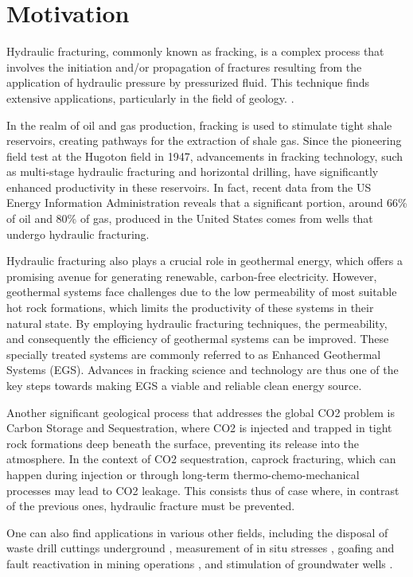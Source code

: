 \section{Motivation}

Hydraulic fracturing, commonly known as fracking, is a complex process that involves the initiation and/or propagation of fractures resulting from the application of hydraulic pressure by pressurized fluid. This technique finds extensive applications, particularly in the field of geology. \cite{adachi2007computer}.

In the realm of oil and gas production, fracking is used to stimulate tight shale reservoirs, creating pathways for the extraction of shale gas. Since the pioneering field test at the Hugoton field in 1947, advancements in fracking technology, such as multi-stage hydraulic fracturing and horizontal drilling, have significantly enhanced productivity in these reservoirs. In fact, recent data from the US Energy Information Administration\cite{eia_data_on_gas, eia_data_on_oil} reveals that a significant portion, around 66\% of oil and 80\% of gas, produced in the United States comes from wells that undergo hydraulic fracturing.

Hydraulic fracturing also plays a crucial role in geothermal energy, which offers a promising avenue for generating renewable, carbon-free electricity. However, geothermal systems face challenges due to the low permeability of most suitable hot rock formations, which limits the productivity of these systems in their natural state. By employing hydraulic fracturing techniques, the permeability, and consequently the efficiency of geothermal systems can be improved. These specially treated systems are commonly referred to as Enhanced Geothermal Systems (EGS). Advances in fracking science and technology are thus one of the key steps towards making EGS a viable and reliable clean energy source.

Another significant geological process that addresses the global CO2 problem is Carbon Storage and Sequestration, where CO2 is injected and trapped in tight rock formations deep beneath the surface, preventing its release into the atmosphere. In the context of CO2 sequestration, caprock fracturing, which can happen during injection or through long-term thermo-chemo-mechanical processes may lead to CO2 leakage.\cite{pan2014tough} This consists thus of case where, in contrast of the previous ones, hydraulic fracture must be prevented. 

One can also find applications in various other fields, including the disposal of waste drill cuttings underground \cite{moschovidis_mounds_2000}, measurement of in situ stresses \cite{desroches_stress_1995, desroches1993modelling}, goafing and fault reactivation in mining operations \cite{board_fluid_1992, zhang_propagation_2002}, and stimulation of groundwater wells \cite{noauthor_permeability_nodate,less_hydrofracture_1994}.


